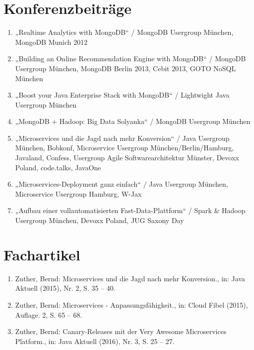 \section*{Konferenzbeiträge}
\begin{enumerate}[label=,leftmargin=0cm,itemsep=10pt]
\item „Realtime Analytics with MongoDB“ / MongoDB Usergroup München, MongoDB Munich 2012
\item „Building an Online Recommendation Engine with MongoDB“ / MongoDB Usergroup München, MongoDB Berlin 2013, Cebit 2013, GOTO NoSQL München
\item „Boost your Java Enterprise Stack with MongoDB“ / Lightwight Java Usergroup München
\item „MongoDB + Hadoop: Big Data Solyanka“ / MongoDB Usergroup München
\item „Microservices und die Jagd nach mehr Konversion“ / Java Usergroup München, Bobkonf, Microservice  Usergroup München/Berlin/Hamburg, Javaland, Confess, Usergroup Agile Softwarearchitektur Münster, Devoxx Poland, code.talks, JavaOne
\item „Microservices-Deployment ganz einfach“ / Java Usergroup München, Microservice  Usergroup Hamburg, W-Jax
\item „Aufbau einer vollautomatisierten Fast-Data-Plattform“ / Spark \& Hadoop Usergroup München, Devoxx Poland, JUG Saxony Day
\end{enumerate}

\section*{Fachartikel}
\begin{enumerate}[label=,leftmargin=0cm,itemsep=10pt]
\item Zuther, Bernd: Microservices und die Jagd nach mehr Konversion., in: Java Aktuell (2015), Nr. 2, S. 35 – 40.
\item Zuther, Bernd: Microservices - Anpassungsfähigkeit., in: Cloud Fibel (2015), Auflage. 2, S. 65 – 68.
\item Zuther, Bernd: Canary-Releases mit der Very Awesome Microservices Platform., in: Java Aktuell (2016), Nr. 3, S. 25 – 27.
\end{enumerate}
